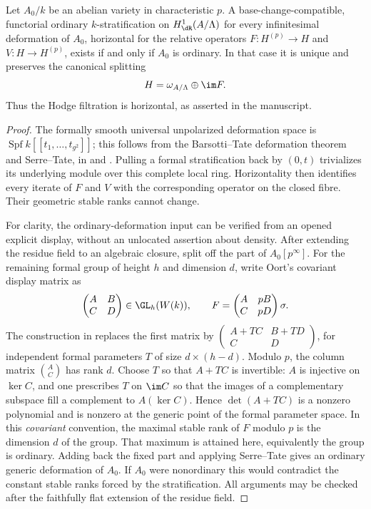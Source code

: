 \begin{proposition}[R7, scans 9:16--18]\label{prop:DE-R7}
Let $A_0/k$ be an abelian variety in characteristic $p$.  A base-change-compatible, functorial ordinary $k$-stratification on $H^1_{\dR}(A/\Lambda)$ for every infinitesimal deformation of $A_0$, horizontal for the relative operators
$F:H^{(p)}\to H$ and $V:H\to H^{(p)}$, exists if and only if $A_0$ is ordinary.  In that case it is unique and preserves the canonical splitting
\[
 H=\omega_{A/\Lambda}\oplus\im F.
\]
Thus the Hodge filtration is horizontal, as asserted in the manuscript.
\end{proposition}
\begin{proof}
The formally smooth universal unpolarized deformation space is $\operatorname{Spf}k[[t_1,\ldots,t_{g^2}]]$; this follows from the Barsotti--Tate deformation theorem and Serre--Tate, in \cite[Corollary~4.8(i)]{Illusie1985BT} and \cite[Theorem~1.2.1]{Katz1981ST}.  Pulling a formal stratification back by $(0,t)$ trivializes its underlying module over this complete local ring.  Horizontality then identifies every iterate of $F$ and $V$ with the corresponding operator on the closed fibre.  Their geometric stable ranks cannot change.

For clarity, the ordinary-deformation input can be verified from an opened explicit display, without an unlocated assertion about density.  After extending the residue field to an algebraic closure, split off the \etale part of $A_0[p^\infty]$.  For the remaining formal group of height $h$ and dimension $d$, write Oort's covariant display matrix as
\[
 \begin{pmatrix}A&B\\C&D\end{pmatrix}\in\GL_h(W(k)),\qquad
 F=\begin{pmatrix}A&pB\\C&pD\end{pmatrix}\sigma.
\]
The construction in \cite[\S\S1.9, 1.12--1.14]{Oort2000} replaces the first matrix by
$\left(\begin{smallmatrix}A+TC&B+TD\\C&D\end{smallmatrix}\right)$, for independent formal parameters $T$ of size $d\times(h-d)$.  Modulo $p$, the column matrix $\binom A C$ has rank $d$.  Choose $T$ so that $A+TC$ is invertible: $A$ is injective on $\ker C$, and one prescribes $T$ on $\im C$ so that the images of a complementary subspace fill a complement to $A(\ker C)$.  Hence $\det(A+TC)$ is a nonzero polynomial and is nonzero at the generic point of the formal parameter space.  In this \emph{covariant} convention, the maximal stable rank of $F$ modulo $p$ is the dimension $d$ of the group.  That maximum is attained here, equivalently the group is ordinary.  Adding back the fixed \etale part and applying Serre--Tate gives an ordinary generic deformation of $A_0$.  If $A_0$ were nonordinary this would contradict the constant stable ranks forced by the stratification.  All arguments may be checked after the faithfully flat extension of the residue field.


\end{proof}
